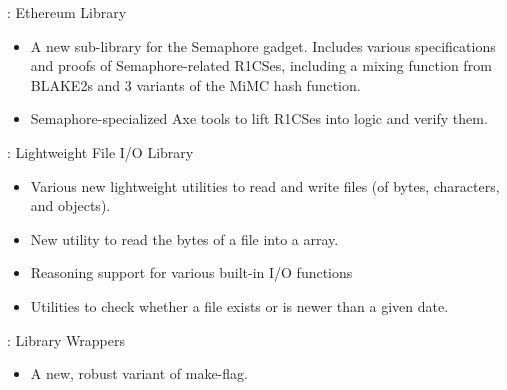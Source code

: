 
\begin{frame}

\implibtitle

: Ethereum Library

\begin{itemize}

\item A new sub-library for the Semaphore gadget.  Includes various
specifications and proofs of Semaphore-related R1CSes, including a
mixing function from BLAKE2s and 3 variants of the MiMC hash function.

\item Semaphore-specialized Axe tools to lift R1CSes into logic and
verify them.

\end{itemize}

\end{frame}


\begin{frame}

\implibtitle

: Lightweight File I/O Library

\begin{itemize}

\item Various new lightweight utilities to read and write files (of bytes, characters, and objects).

\item New utility to read the bytes of a file into a  array.

\item Reasoning support for various built-in I/O functions

\item Utilities to check whether a file exists or is newer than a given date.

\end{itemize}

\end{frame}


\begin{frame}

\implibtitle

: Library Wrappers

\begin{itemize}

\item A new, robust variant of make-flag.

\end{itemize}

\end{frame}

